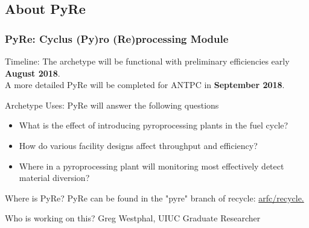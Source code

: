 \subsection{About PyRe}
\begin{frame}
\frametitle{PyRe: Cyclus (Py)ro (Re)processing Module}
\begin{block}{Timeline:} 
	The archetype will be functional with preliminary efficiencies early \textbf{August 2018}. \\
	A more detailed PyRe will be completed for ANTPC in \textbf{September 2018}.
\end{block}
\begin{block}{Archetype Uses:} 
	PyRe will answer the following questions
	\begin{itemize}
		\item What is the effect of introducing pyroprocessing plants in the fuel cycle?
		\item How do various facility designs affect throughput and efficiency?
		\item Where in a pyroprocessing plant will monitoring most 
                        effectively detect material diversion?
	\end{itemize}
\end{block}
\begin{block}{Where is PyRe?} 
	PyRe can be found in the "pyre" branch of recycle: 	\href{https://github.com/arfc/recycle}{arfc/recycle.} 
\end{block}
\begin{block}{Who is working on this?}
	Greg Westphal, UIUC Graduate Researcher
\end{block}
\end{frame}

